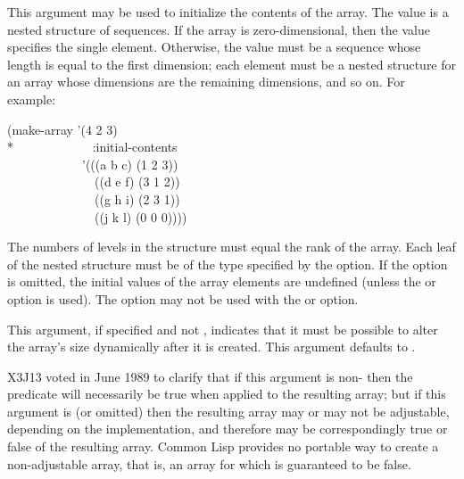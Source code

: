 \begin{defun}[Function]
\begin{flushdesc}
\item[\cd{:initial-contents}]
This argument may be used to initialize the
contents of the array.  The value is a nested structure of sequences.  If
the array is zero-dimensional, then the value specifies the single
element.  Otherwise, the value must be a sequence whose length is equal
to the first dimension; each element must be a nested structure for an
array whose dimensions are the remaining dimensions, and so on.
For example:
\begin{lisp}
(make-array '(4 2 3) \\*
~~~~~~~~~~~~:initial-contents \\
~~~~~~~~~~~~'(((a b c) (1 2 3)) \\
~~~~~~~~~~~~~~((d e f) (3 1 2)) \\
~~~~~~~~~~~~~~((g h i) (2 3 1)) \\
~~~~~~~~~~~~~~((j k l) (0 0 0))))
\end{lisp}
The numbers of levels in the structure must equal the rank of the array.
Each leaf of the nested structure
must be of the type specified by the  option.  If the
 option is omitted, the initial values of the array
elements are undefined (unless the  or
 option is used).
The  option may not be used with the
 or  option.

\item[\cd{:initial-contents}]


\item[\cd{:adjustable}]
This argument, if specified and not {\false}, indicates that it
must be possible to alter the array's size dynamically after it is
created.  This argument defaults to {\nil}.

\begin{newer}
X3J13 voted in June 1989
to clarify that if this argument is non-{\false}
then the predicate  will necessarily be true when applied
to the resulting array; but if this argument is  (or omitted) then the
resulting array may or may not be adjustable, depending on the implementation,
and therefore  may be correspondingly true or false of
the resulting array.  Common Lisp provides no portable way to create a
non-adjustable array, that is, an array for which  is
guaranteed to be false.
\end{newer}


\end{flushdesc}
\end{defun}
